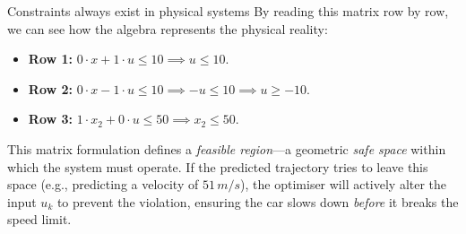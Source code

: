 \begin{examplebox}{Constraints always exist in physical systems}
By reading this matrix row by row, we can see how the algebra represents the physical reality:
\begin{itemize}
	\item \textbf{Row 1:} $0 \cdot x + 1 \cdot u \leq 10 \implies u \leq 10$.
	\item \textbf{Row 2:} $0 \cdot x - 1 \cdot u \leq 10 \implies -u \leq 10 \implies u \geq -10$.
	\item \textbf{Row 3:} $1 \cdot x_2 + 0 \cdot u \leq 50 \implies x_2 \leq 50$.
\end{itemize}

This matrix formulation defines a \emph{feasible region}—a geometric \emph{safe space} within which the system must operate. If the predicted trajectory tries to leave this space (e.g., predicting a velocity of $51 \, m/s$), the optimiser will actively alter the input $u_k$ to prevent the violation, ensuring the car slows down \textit{before} it breaks the speed limit.
\end{examplebox}



